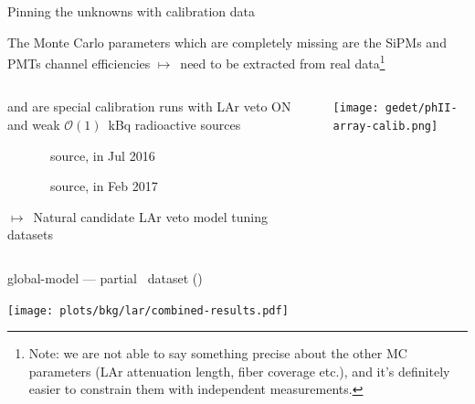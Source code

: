 \documentclass[10pt,aspectratio=169]{beamer}
\newcommand{\arrow}{$\longmapsto$}
\begin{document}
\begin{frame}{Pinning the unknowns with calibration data}
  \begin{simpleblock}
    The Monte Carlo parameters which are completely missing are the SiPMs and
    PMTs \alert{channel efficiencies} \arrow\ need to be extracted from real
    data\footnote{Note: we are not able to say something precise about the
    other MC parameters (LAr attenuation length, fiber coverage etc.), and it's
    definitely easier to constrain them with independent measurements.}
  \end{simpleblock}

  \vspace*{0.5cm}
  \begin{columns}
    \begin{column}{0.7\textwidth}\setlength{\parskip}{10pt}%
       and  are special calibration runs with LAr veto ON and
      weak $\mathcal{O}(1)$~kBq radioactive sources
      \begin{description}
        \item[] \Th\ source, in Jul 2016
        \item[] \Ra\ source, in Feb 2017
      \end{description}

      \alert{\arrow\ Natural candidate LAr veto model tuning datasets}
    \end{column}
    \begin{column}{0.25\textwidth}
      \hspace{-0.5cm}\texttt{[image: gedet/phII-array-calib.png]}
    \end{column}
  \end{columns}
\end{frame}
\begin{frame}[plain]{global-model --- partial \phasetwo\ dataset (\gexpophasetwobkg)}
  \begin{center}
    \texttt{[image: plots/bkg/lar/combined-results.pdf]}
  \end{center}
\end{frame}
\end{document}
